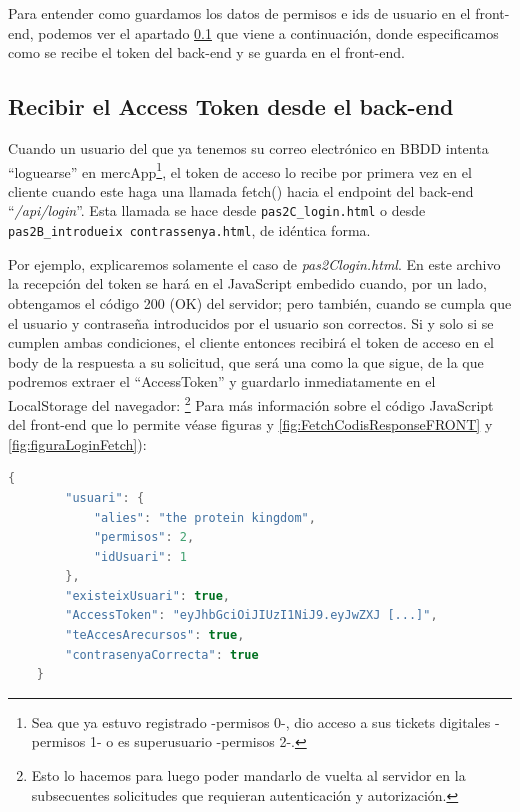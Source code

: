\documentclass[a4paper,12pt]{report}
\begin{document}
	
	Para entender como guardamos los datos de permisos e ids de usuario en el front-end, podemos ver el apartado \ref{sec:recibirAccesTokenENFRONTEND} que viene a continuación, donde especificamos como se recibe el token del back-end y se guarda en el front-end.
	
	\subsection{Recibir el Access Token desde el back-end}
	\label{sec:recibirAccesTokenENFRONTEND}
	
	Cuando un usuario del que ya tenemos su correo electrónico en BBDD intenta ``loguearse'' en mercApp\footnote{Sea que ya estuvo registrado -permisos 0-, dio acceso a sus tickets digitales -permisos 1- o es superusuario -permisos 2-.}, el token de acceso lo recibe por primera vez en el cliente cuando este haga una llamada fetch() hacia el endpoint del back-end ``\textit{/api/login}''. Esta llamada se hace desde \texttt{pas2C\_login.html} o desde \texttt{pas2B\_introdueix contrassenya.html}, de idéntica forma.
	
	
	Por ejemplo, explicaremos solamente el caso de \textit{pas2Clogin.html}. En este archivo la recepción del token se hará en el JavaScript embedido cuando, por un lado, obtengamos el código 200 (OK) del servidor; pero también, cuando se cumpla que el usuario y contraseña introducidos por el usuario son correctos. Si y solo si se cumplen ambas condiciones, el cliente entonces recibirá el token de acceso en el body de la respuesta a su solicitud, que será una como la que sigue, de la que podremos extraer el ``AccessToken'' y guardarlo inmediatamente en el LocalStorage del navegador: \footnote{Esto lo hacemos para luego poder mandarlo de vuelta al servidor en la subsecuentes solicitudes que requieran autenticación y autorización.} Para más información sobre el código JavaScript del front-end que lo permite véase figuras y \ref{fig:FetchCodisResponseFRONT} y \ref{fig:figuraLoginFetch}):
	
\begin{lstlisting}[language=Java, basicstyle=\ttfamily\footnotesize, keywordstyle=\color{magenta}]
	{
		"usuari": {
			"alies": "the protein kingdom",
			"permisos": 2,
			"idUsuari": 1
		},
		"existeixUsuari": true,
		"AccessToken": "eyJhbGciOiJIUzI1NiJ9.eyJwZXJ [...]",
		"teAccesArecursos": true,
		"contrasenyaCorrecta": true
	}
\end{lstlisting}
	
\end{document}

